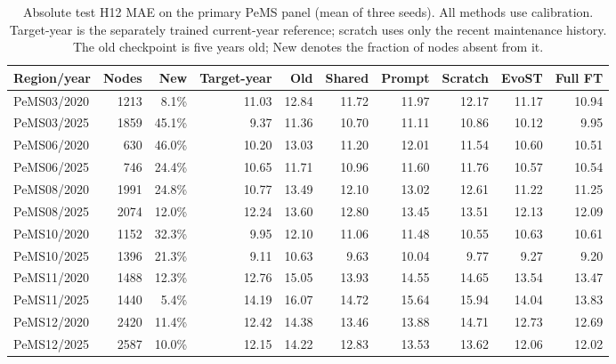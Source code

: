 \begin{table}[t]
\centering
\caption{Absolute test H12 MAE on the primary PeMS panel (mean of three seeds). All methods use calibration. Target-year is the separately trained current-year reference; scratch uses only the recent maintenance history. The old checkpoint is five years old; New denotes the fraction of nodes absent from it.}
\label{tab:absolute}
\begin{tabular}{lrrrrrrrrr}
\toprule
Region/year & Nodes & New & Target-year & Old & Shared & Prompt & Scratch & EvoST & Full FT \\
\midrule
PeMS03/2020 & 1213 & 8.1\% & 11.03 & 12.84 & 11.72 & 11.97 & 12.17 & 11.17 & 10.94 \\
PeMS03/2025 & 1859 & 45.1\% & 9.37 & 11.36 & 10.70 & 11.11 & 10.86 & 10.12 & 9.95 \\
PeMS06/2020 & 630 & 46.0\% & 10.20 & 13.03 & 11.20 & 12.01 & 11.54 & 10.60 & 10.51 \\
PeMS06/2025 & 746 & 24.4\% & 10.65 & 11.71 & 10.96 & 11.60 & 11.76 & 10.57 & 10.54 \\
PeMS08/2020 & 1991 & 24.8\% & 10.77 & 13.49 & 12.10 & 13.02 & 12.61 & 11.22 & 11.25 \\
PeMS08/2025 & 2074 & 12.0\% & 12.24 & 13.60 & 12.80 & 13.45 & 13.51 & 12.13 & 12.09 \\
PeMS10/2020 & 1152 & 32.3\% & 9.95 & 12.10 & 11.06 & 11.48 & 10.55 & 10.63 & 10.61 \\
PeMS10/2025 & 1396 & 21.3\% & 9.11 & 10.63 & 9.63 & 10.04 & 9.77 & 9.27 & 9.20 \\
PeMS11/2020 & 1488 & 12.3\% & 12.76 & 15.05 & 13.93 & 14.55 & 14.65 & 13.54 & 13.47 \\
PeMS11/2025 & 1440 & 5.4\% & 14.19 & 16.07 & 14.72 & 15.64 & 15.94 & 14.04 & 13.83 \\
PeMS12/2020 & 2420 & 11.4\% & 12.42 & 14.38 & 13.46 & 13.88 & 14.71 & 12.73 & 12.69 \\
PeMS12/2025 & 2587 & 10.0\% & 12.15 & 14.22 & 12.83 & 13.53 & 13.62 & 12.06 & 12.02 \\
\bottomrule
\end{tabular}
\end{table}
